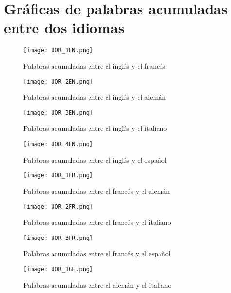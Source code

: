 \section{Gráficas de palabras acumuladas entre dos idiomas}
\label{palabras.acumuladas.apendice}

\begin{figure}[h!]
	\centering
	\texttt{[image: UOR\_1EN.png]}
	\label{fig.U_EF}
	\caption{Palabras acumuladas entre el inglés y el francés}
\end{figure}


\begin{figure}[h!]
	\centering
	\texttt{[image: UOR\_2EN.png]}
	\label{fig.U_EG}
	\caption{Palabras acumuladas entre el inglés y el alemán}
\end{figure}


\begin{figure}[h!]
	\centering
	\texttt{[image: UOR\_3EN.png]}
	\label{fig.U_EI}
	\caption{Palabras acumuladas entre el inglés y el italiano}
\end{figure}

\begin{figure}[h!]
	\centering
	\texttt{[image: UOR\_4EN.png]}
	\label{fig.U_ES}
	\caption{Palabras acumuladas entre el inglés y el español}
\end{figure}

\begin{figure}[h!]
	\centering
	\texttt{[image: UOR\_1FR.png]}
	\label{fig.U_FG}
	\caption{Palabras acumuladas entre el francés y el alemán}
\end{figure}

\begin{figure}[h!]
	\centering
	\texttt{[image: UOR\_2FR.png]}
	\label{fig.U_FI}
	\caption{Palabras acumuladas entre el francés y el italiano}
\end{figure}

\begin{figure}[h!]
	\centering
	\texttt{[image: UOR\_3FR.png]}
	\label{fig.U_FS}
	\caption{Palabras acumuladas entre el francés y el español}
\end{figure}



\begin{figure}[h!]
	\centering
	\texttt{[image: UOR\_1GE.png]}
	\label{fig.U_GI}
	\caption{Palabras acumuladas entre el alemán y el italiano}
\end{figure}


